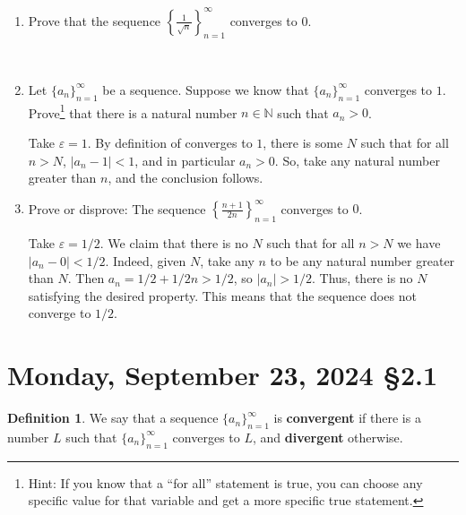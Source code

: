 \documentclass[12pt]{amsart}
\def\ds{\displaystyle}
\def\Mo{Monday}
\def\e{\varepsilon}
\newcommand{\N}{\mathbb{N}}
\numberwithin{equation}{section}
\theoremstyle{plain} %
\newcommand{\Sept}[3]{\section{#2, September #1, 2024 \quad \S#3}}
\theoremstyle{definition}
\newtheorem{defn}[equation]{Definition}
\theoremstyle{remark}
\begin{document}
\begin{enumerate}
\

\item Prove that the sequence $\ds \left\{ \frac{1}{\sqrt{n}} \right\}_{n=1}^\infty$ converges to $0$.

\


\item Let $\ds \{a_n\}_{n=1}^\infty$ be a sequence. Suppose we know that $\{a_n\}_{n=1}^\infty$ converges to $1$. Prove\footnote{Hint: If you know that a ``for all'' statement is true, you can choose any specific value for that variable and get a more specific true statement.} that there is a natural number $n\in \N$ such that $a_n>0$.

\begin{framed}
Take $\e = 1$. By definition of converges to $1$, there is some $N$ such that for all $n>N$, $|a_n  - 1|< 1$, and in particular $a_n >0$. So, take any natural number greater than $n$, and the conclusion follows.
\end{framed}



\item Prove or disprove: The sequence $\ds \left\{\frac{n+1}{2n} \right\}_{n=1}^\infty$ converges to $0$.

\begin{framed}
Take $\e = 1/2$. We claim that there is no $N$ such that for all $n>N$ we have $|a_n - 0| < 1/2$. Indeed, given $N$, take any $n$ to be any natural number greater than $N$. Then $a_n = 1/2 + 1/2n > 1/2$, so $|a_n| > 1/2$. Thus, there is no $N$ satisfying the desired property. This means that the sequence does not converge to $1/2$.
\end{framed}


\end{enumerate}


\newpage


\Sept{23}{\Mo}{2.1}

\begin{defn} We say that a sequence $\{ a_n \}_{n=1}^\infty$ is \textbf{convergent} if there is a number $L$  such that $\{ a_n \}_{n=1}^\infty$ converges to $L$, and \textbf{divergent} otherwise.
\end{defn}
\end{document}
